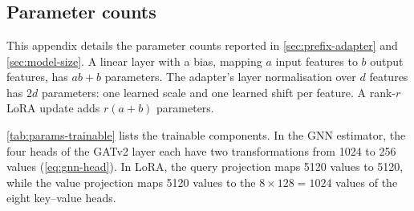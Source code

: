 \appendix
\chapter*{\fuggelek}
\setcounter{chapter}{\appendixnumber}

\section{Parameter counts}
\label{app:parameters}

This appendix details the parameter counts reported in \autoref{sec:prefix-adapter} and \autoref{sec:model-size}. A linear layer with a bias, mapping $a$ input features to $b$ output features, has $ab+b$ parameters. The adapter's layer normalisation over $d$ features has $2d$ parameters: one learned scale and one learned shift per feature. A rank-$r$ LoRA update adds $r(a+b)$ parameters.

\autoref{tab:params-trainable} lists the trainable components. In the GNN estimator, the four heads of the GATv2 layer each have two transformations from 1024 to 256 values (\autoref{eq:gnn-head}). In LoRA, the query projection maps 5120 values to 5120, while the value projection maps 5120 values to the $8 \times 128 = 1024$ values of the eight key--value heads.

